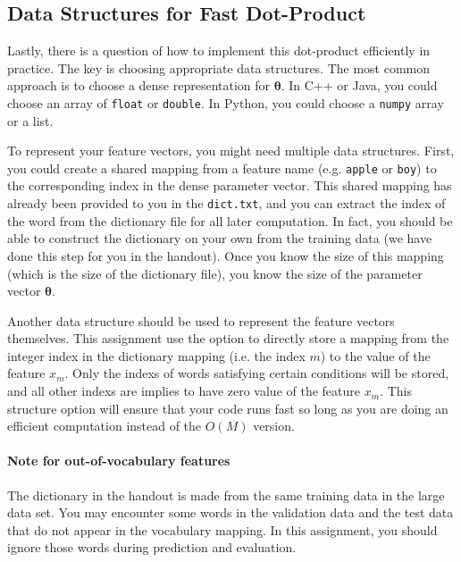\documentclass[11pt]{article}
\numberwithin{equation}{section} %
\numberwithin{figure}{section} %
\numberwithin{table}{section} %
\newcommand{\thetav     }{\boldsymbol \theta     }
\begin{document}
\subsection{Data Structures for Fast Dot-Product} \label{datastructuredp}

Lastly, there is a question of how to implement this dot-product efficiently in practice. The key is choosing appropriate data structures. The most common approach is to choose a dense representation for $\thetav$. In C++ or Java, you could choose an array of \lstinline{float} or \lstinline{double}. In Python, you could choose a \lstinline{numpy} array or a list. 

To represent your feature vectors, you might need multiple data structures. First, you could create a shared mapping from a feature  name (e.g. {\tt apple} or {\tt boy}) to the corresponding index in the dense parameter vector. This shared mapping has already been provided to you in the \lstinline{dict.txt}, and you can extract the index of the word from the dictionary file for all later computation. In fact, you should be able to construct the dictionary on your own from the training data (we have done this step for you in the handout). Once you know the size of this mapping (which is the size of the dictionary file), you know the size of the parameter vector $\thetav$. 

Another data structure should be used to represent the feature vectors themselves. This assignment use the option to directly store a mapping from the integer index in the dictionary mapping (i.e. the index $m$) to the value of the feature $x_m$. Only the indexs of words satisfying certain conditions will be stored, and all other indexs are implies to have zero value of the feature $x_m$. This structure option will ensure that your code runs fast so long as you are doing an efficient computation instead of the $O(M)$ version.

\paragraph{Note for out-of-vocabulary features} The dictionary in the handout is made from the same training data in the large data set. You may encounter some words in the validation data and the test data that do not appear in the vocabulary mapping. In this assignment, you should ignore those words during prediction and evaluation.
\end{document}
